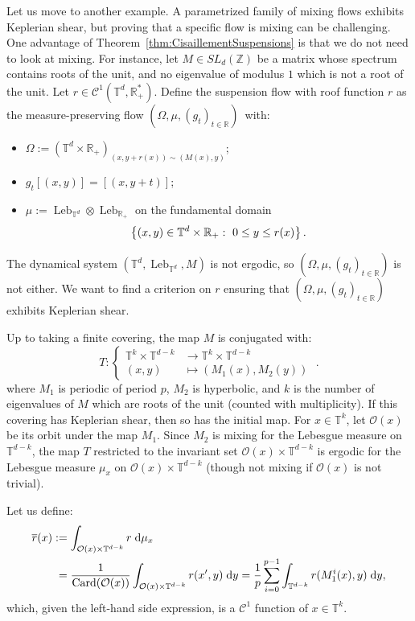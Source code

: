 \documentclass[AHL,Unicode,longabstracts]{cedram}
\DeclareMathOperator{\Card}{Card}
\DeclareMathOperator{\Leb}{Leb}
\newcommand{\Z}{\mathbb{Z}}
\newcommand{\R}{\mathbb{R}}
\newcommand{\Tbb}{\mathbb{T}}
\newcommand{\Ccal}{\mathcal{C}}
\newcommand{\Ocal}{\mathcal{O}}
\newcommand{\dd}{\;{\rm d}}
\begin{document}
Let us move to another example. A parametrized family of mixing flows exhibits Keplerian shear, but proving that a specific flow is mixing can be challenging. One advantage of Theorem~\ref{thm:CisaillementSuspensions} is that we do not need to look at mixing. For instance, let $M \in SL_d (\Z)$ be a matrix whose spectrum contains roots of the unit, and no eigenvalue of modulus $1$ which is not a root of the unit. Let $r \in \Ccal^1 (\Tbb^d, \R_+^*)$. Define the suspension flow with roof function $r$ as the measure-preserving flow $(\Omega, \mu, (g_t)_{t \in \R})$~with:
\begin{itemize}
\item $\Omega := (\Tbb^d \times \R_+)_{(x,y+r(x)) \sim (M(x),y)}$;
\item $g_t [(x,y)] = [(x,y+t)]$;
\item $\mu := \Leb_{\Tbb^d} \otimes \Leb_{\R_+}$ on the fundamental domain 
\[
\left\{(x,y) \in \Tbb^d \times \R_+ :\linebreak\ 0 \leq y \leq r(x) \right\}.
\]
\end{itemize}
The dynamical system $(\Tbb^d, \Leb_{\Tbb^d}, M)$ is not ergodic, so $(\Omega, \mu, (g_t)_{t \in \R})$ is not either. We want to find a criterion on $r$ ensuring that $(\Omega, \mu, (g_t)_{t \in \R})$ exhibits Keplerian shear.


Up to taking a finite covering, the map $M$ is conjugated with:
\[
T :
\begin{cases}
\Tbb^k \times \Tbb^{d-k} & \to \Tbb^k \times \Tbb^{d-k} \\
(x,y) & \mapsto (M_1 (x), M_2 (y))
\end{cases}\;.
\]
where $M_1$ is periodic of period $p$, $M_2$ is hyperbolic, and $k$ is the number of eigenvalues of $M$ which are roots of the unit (counted with multiplicity). If this covering has Keplerian shear, then so has the initial map. For $x \in \Tbb^k$, let $\Ocal (x)$ be its orbit under the map $M_1$. Since $M_2$ is mixing for the Lebesgue measure on $\Tbb^{d-k}$, the map $T$ restricted to the invariant set $\Ocal (x) \times \Tbb^{d-k}$ is ergodic for the Lebesgue measure $\mu_x$ on $\Ocal (x) \times \Tbb^{d-k}$ (though not mixing if $\Ocal (x)$ is not trivial).


Let us define:
\begin{align*}
\overline{r} (x) & := \int_{\Ocal (x) \times \Tbb^{d-k}} r \dd \mu_x \\
& \;= \frac{1}{\Card (\Ocal (x))} \int_{\Ocal (x) \times \Tbb^{d-k}} r (x',y) \dd y = \frac{1}{p} \sum_{i=0}^{p-1} \int_{\Tbb^{d-k}} r (M_1^i (x),y) \dd y,
\end{align*}
which, given the left-hand side expression, is a $\Ccal^1$ function of $x \in \Tbb^k$.
\end{document}
